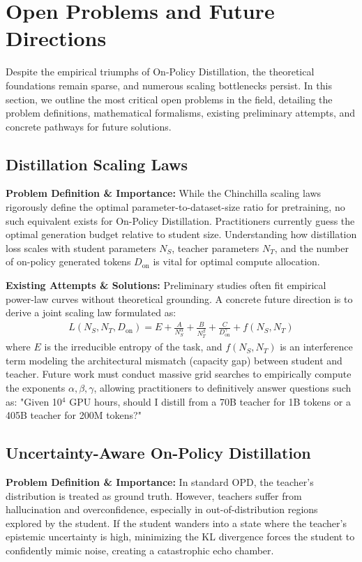 \section{Open Problems and Future Directions}
\label{sec:future}

Despite the empirical triumphs of On-Policy Distillation, the theoretical foundations remain sparse, and numerous scaling bottlenecks persist. In this section, we outline the most critical open problems in the field, detailing the problem definitions, mathematical formalisms, existing preliminary attempts, and concrete pathways for future solutions.

\subsection{Distillation Scaling Laws}
\textbf{Problem Definition \& Importance:} While the Chinchilla scaling laws rigorously define the optimal parameter-to-dataset-size ratio for pretraining, no such equivalent exists for On-Policy Distillation. Practitioners currently guess the optimal generation budget relative to student size. Understanding how distillation loss scales with student parameters $N_S$, teacher parameters $N_T$, and the number of on-policy generated tokens $D_{\text{on}}$ is vital for optimal compute allocation.

\textbf{Existing Attempts \& Solutions:} Preliminary studies often fit empirical power-law curves without theoretical grounding. A concrete future direction is to derive a joint scaling law formulated as:
\begin{align}
L(N_S, N_T, D_{\text{on}}) = E + \frac{A}{N_S^\alpha} + \frac{B}{N_T^\beta} + \frac{C}{D_{\text{on}}^\gamma} + f(N_S, N_T) \label{eq:scaling}
\end{align}
where $E$ is the irreducible entropy of the task, and $f(N_S, N_T)$ is an interference term modeling the architectural mismatch (capacity gap) between student and teacher. Future work must conduct massive grid searches to empirically compute the exponents $\alpha, \beta, \gamma$, allowing practitioners to definitively answer questions such as: "Given 10$^4$ GPU hours, should I distill from a 70B teacher for 1B tokens or a 405B teacher for 200M tokens?"

\subsection{Uncertainty-Aware On-Policy Distillation}
\textbf{Problem Definition \& Importance:} In standard OPD, the teacher's distribution is treated as ground truth. However, teachers suffer from hallucination and overconfidence, especially in out-of-distribution regions explored by the student. If the student wanders into a state where the teacher's epistemic uncertainty is high, minimizing the KL divergence forces the student to confidently mimic noise, creating a catastrophic echo chamber.

